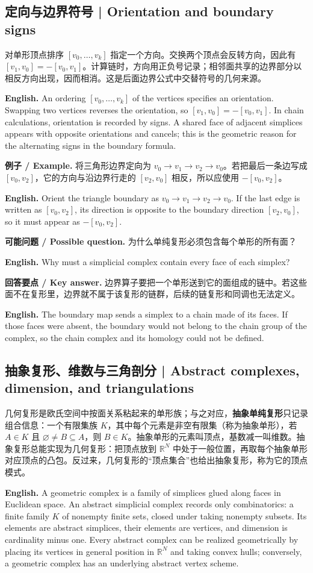 \documentclass[UTF8,11pt,a4paper]{ctexart}
\newcommand{\EN}[1]{\par\noindent\textbf{English.} #1\par}
\newcommand{\EX}[2]{\par\noindent\textbf{例子 / Example.} #1\par\EN{#2}}
\newcommand{\ASK}[4]{\par\noindent\textbf{可能问题 / Possible question.} #1\par\EN{#2}\noindent\textbf{回答要点 / Key answer.} #3\par\EN{#4}\medskip}
\begin{document}
\subsection{定向与边界符号 | Orientation and boundary signs}
\noindent 对单形顶点排序 $[v_0,\ldots,v_k]$ 指定一个方向。交换两个顶点会反转方向，因此有 $[v_1,v_0]=-[v_0,v_1]$。计算链时，方向用正负号记录；相邻面共享的边界部分以相反方向出现，因而相消。这是后面边界公式中交替符号的几何来源。
\EN{An ordering $[v_0,\ldots,v_k]$ of the vertices specifies an orientation. Swapping two vertices reverses the orientation, so $[v_1,v_0]=-[v_0,v_1]$. In chain calculations, orientation is recorded by signs. A shared face of adjacent simplices appears with opposite orientations and cancels; this is the geometric reason for the alternating signs in the boundary formula.}
\EX{将三角形边界定向为 $v_0\to v_1\to v_2\to v_0$。若把最后一条边写成 $[v_0,v_2]$，它的方向与沿边界行走的 $[v_2,v_0]$ 相反，所以应使用 $-[v_0,v_2]$。}{Orient the triangle boundary as $v_0\to v_1\to v_2\to v_0$. If the last edge is written as $[v_0,v_2]$, its direction is opposite to the boundary direction $[v_2,v_0]$, so it must appear as $-[v_0,v_2]$.}
\ASK{为什么单纯复形必须包含每个单形的所有面？}{Why must a simplicial complex contain every face of each simplex?}{边界算子要把一个单形送到它的面组成的链中。若这些面不在复形里，边界就不属于该复形的链群，后续的链复形和同调也无法定义。}{The boundary map sends a simplex to a chain made of its faces. If those faces were absent, the boundary would not belong to the chain group of the complex, so the chain complex and its homology could not be defined.}

\subsection{抽象复形、维数与三角剖分 | Abstract complexes, dimension, and triangulations}
\noindent 几何复形是欧氏空间中按面关系粘起来的单形族；与之对应，\textbf{抽象单纯复形}只记录组合信息：一个有限集族 $K$，其中每个元素是非空有限集（称为抽象单形），若 $A\in K$ 且 $\varnothing\ne B\subseteq A$，则 $B\in K$。抽象单形的元素叫顶点，基数减一叫维数。抽象复形总能实现为几何复形：把顶点放到 $\mathbb R^N$ 中处于一般位置，再取每个抽象单形对应顶点的凸包。反过来，几何复形的“顶点集合”也给出抽象复形，称为它的顶点模式。
\EN{A geometric complex is a family of simplices glued along faces in Euclidean space. An abstract simplicial complex records only combinatorics: a finite family $K$ of nonempty finite sets, closed under taking nonempty subsets. Its elements are abstract simplices, their elements are vertices, and dimension is cardinality minus one. Every abstract complex can be realized geometrically by placing its vertices in general position in $\mathbb R^N$ and taking convex hulls; conversely, a geometric complex has an underlying abstract vertex scheme.}
\end{document}

